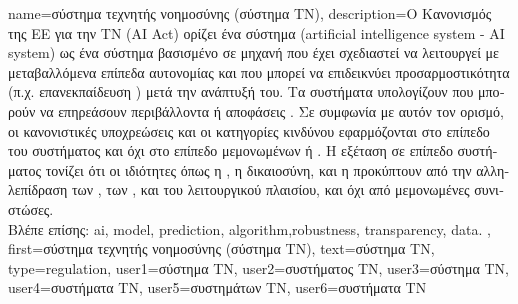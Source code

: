 {name={\foreignlanguage{greek}{σύστημα τεχνητής νοημοσύνης (σύστημα ΤΝ)}},
	description={\foreignlanguage{greek}{Ο Κανονισμός της ΕΕ για την 
		ΤΝ} 
		(AI Act) \cite{AIact} \foreignlanguage{greek}{ορίζει ένα σύστημα}  
		(artificial intelligence system - AI system) \foreignlanguage{greek}{ως ένα σύστημα βασισμένο σε μηχανή
		που έχει σχεδιαστεί να λειτουργεί με μεταβαλλόμενα επίπεδα αυτονομίας και που
		μπορεί να επιδεικνύει προσαρμοστικότητα (π.χ. επανεκπαίδευση} )
		\foreignlanguage{greek}{μετά την ανάπτυξή του. Τα συστήματα}  
		\foreignlanguage{greek}{υπολογίζουν}  \foreignlanguage{greek}{που 
		μπορούν να επηρεάσουν περιβάλλοντα ή αποφάσεις} \cite{EUAIAct2024}. 
		\foreignlanguage{greek}{Σε συμφωνία με αυτόν τον ορισμό, οι κανονιστικές
		υποχρεώσεις και οι κατηγορίες κινδύνου εφαρμόζονται στο επίπεδο του συστήματος} 
		 \foreignlanguage{greek}{και όχι στο επίπεδο μεμονωμένων}
		 \foreignlanguage{greek}{ή} .  
		\foreignlanguage{greek}{Η εξέταση σε επίπεδο συστήματος τονίζει ότι οι ιδιότητες όπως η} 
		, \foreignlanguage{greek}{η δικαιοσύνη, και η}  
		\foreignlanguage{greek}{προκύπτουν από την αλληλεπίδραση των} , 
		\foreignlanguage{greek}{των} , \foreignlanguage{greek}{και του λειτουργικού 
		πλαισίου, και όχι από μεμονωμένες συνιστώσες.} 
		\\
		\foreignlanguage{greek}{Βλέπε επίσης:} \gls{ai}, \gls{model}, \gls{prediction}, \gls{algorithm},\gls{robustness}, 
		\gls{transparency}, \gls{data}. },
 	first={\foreignlanguage{greek}{σύστημα τεχνητής νοημοσύνης (σύστημα ΤΝ)}},
 	text={\foreignlanguage{greek}{σύστημα ΤΝ}},
 	type=regulation,
	user1={\foreignlanguage{greek}{σύστημα ΤΝ}}, %
	user2={\foreignlanguage{greek}{συστήματος ΤΝ}}, %
	user3={\foreignlanguage{greek}{σύστημα ΤΝ}}, %
	user4={\foreignlanguage{greek}{συστήματα ΤΝ}}, %
	user5={\foreignlanguage{greek}{συστημάτων ΤΝ}}, %
	user6={\foreignlanguage{greek}{συστήματα ΤΝ}} %
}

